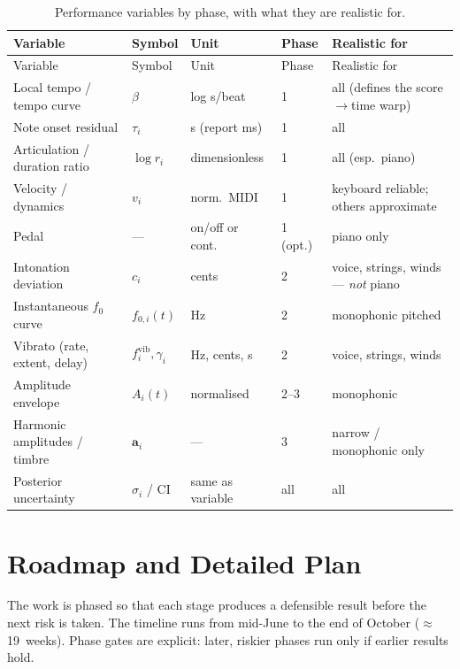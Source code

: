 \documentclass[11pt,a4paper]{report}
\begin{document}
\begin{longtable}{@{}p{3.1cm}p{1.7cm}p{2.0cm}p{0.7cm}p{4.4cm}@{}}
\caption{Performance variables by phase, with what they are realistic for.}
\label{tab:variables}\\
\toprule
Variable & Symbol & Unit & Phase & Realistic for \\
\midrule
\endfirsthead
\toprule
Variable & Symbol & Unit & Phase & Realistic for \\
\midrule
\endhead
\bottomrule
\endfoot
Local tempo / tempo curve & $\beta$ & log s/beat & 1 & all (defines the score$\to$time warp) \\
Note onset residual & $\tau_i$ & s (report ms) & 1 & all \\
Articulation / duration ratio & $\log r_i$ & dimensionless & 1 & all (esp.\ piano) \\
Velocity / dynamics & $v_i$ & norm.\ MIDI & 1 & keyboard reliable; others approximate \\
Pedal & --- & on/off or cont. & 1 (opt.) & piano only \\
Intonation deviation & $c_i$ & cents & 2 & voice, strings, winds --- \emph{not} piano \\
Instantaneous $f_0$ curve & $f_{0,i}(t)$ & Hz & 2 & monophonic pitched \\
Vibrato (rate, extent, delay) & $f_i^{\mathrm{vib}}, \gamma_i$ & Hz, cents, s & 2 & voice, strings, winds \\
Amplitude envelope & $A_i(t)$ & normalised & 2--3 & monophonic \\
Harmonic amplitudes / timbre & $\mathbf a_i$ & --- & 3 & narrow / monophonic only \\
Posterior uncertainty & $\sigma_i$ / CI & same as variable & all & all \\
\end{longtable}


\chapter{Roadmap and Detailed Plan}\label{ch:roadmap}

The work is phased so that each stage produces a defensible result before the next
risk is taken. The timeline runs from mid-June to the end of October
($\approx$19~weeks). Phase gates are explicit: later, riskier phases run only if
earlier results hold.
\end{document}
